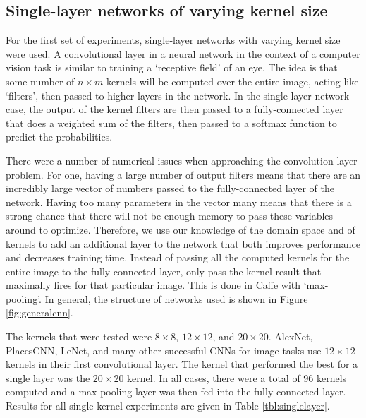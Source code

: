 \documentclass[10pt]{article}
\begin{document}
\subsection{Single-layer networks of varying kernel size}

For the first set of experiments, single-layer networks with varying kernel size were used. A convolutional layer in a neural network in the context of a computer vision task is similar to training a `receptive field' of an eye. The idea is that some number of $n \times m$ kernels will be computed over the entire image, acting like `filters', then passed to higher layers in the network. In the single-layer network case, the output of the kernel filters are then passed to a fully-connected layer that does a weighted sum of the filters, then passed to a softmax function to predict the probabilities. 

There were a number of numerical issues when approaching the convolution layer problem. For one, having a large number of output filters means that there are an incredibly large vector of numbers passed to the fully-connected layer of the network. Having too many parameters in the vector many means that there is a strong chance that there will not be enough memory to pass these variables around to optimize. Therefore, we use our knowledge of the domain space and of kernels to add an additional layer to the network that both improves performance and decreases training time. Instead of passing all the computed kernels for the entire image to the fully-connected layer, only pass the kernel result that maximally fires for that particular image. This is done in Caffe with `max-pooling'. In general, the structure of networks used is shown in Figure \ref{fig:generalcnn}. 

The kernels that were tested were $8 \times 8$, $12 \times 12$, and $20 \times 20$. AlexNet, PlacesCNN, LeNet, and many other successful CNNs for image tasks use $12 \times 12$ kernels in their first convolutional layer. The kernel that performed the best for a single layer was the $20 \times 20$ kernel. In all cases, there were a total of $96$ kernels computed and a max-pooling layer was then fed into the fully-connected layer. Results for all single-kernel experiments are given in Table \ref{tbl:singlelayer}.
\end{document}
